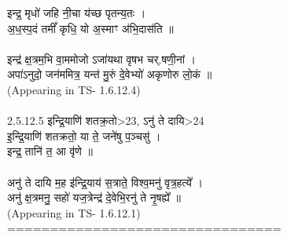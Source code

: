 \documentclass[17pt]{extarticle}
\begin{document}
इन्द्र॒ मृधो॑ जहि नी॒चा य॑च्छ पृतन्य॒तः । \\अ॒ध॒स्प॒दं तमीं᳚ कृधि॒ यो अ॒स्माꣳ अ॑भि॒दास॑ति ॥\\\\इन्द्र॑ क्ष॒त्रम॒भि वा॒ममोजो ऽजा॑यथा वृषभ चर्.षणी॒नां । \\अपा॑ऽनुदो॒ जन॑ममित्र॒ यन्त॑ मु॒रुं दे॒वेभ्यो॑ अकृणोरु लो॒कं ॥ \\(Appearing in TS- 1.6.12.4)\\\\2.5.12.5 इन्द्रि॒याणि॑ शतक्र॒तो>23, ऽनु॑ ते दायि>24\\इ॒न्द्रि॒याणि॑ शतक्रतो॒ या ते॒ जने॑षु प॒ञ्चसु॑ । \\इन्द्र॒ तानि॑ त॒ आ वृ॑णे ॥\\\\अनु॑ ते दायि म॒ह इ॑न्द्रि॒याय॑ स॒त्राते॒ विश्व॒मनु॑ वृत्र॒हत्ये᳚ । \\अनु॑ क्ष॒त्रमनु॒ सहो॑ यज॒त्रेन्द्र॑ दे॒वेभि॒रनु॑ ते नृ॒षह्ये᳚ ॥ \\(Appearing in TS- 1.6.12.1)\\================================\\
                \pagebreak
        
\end{document}
